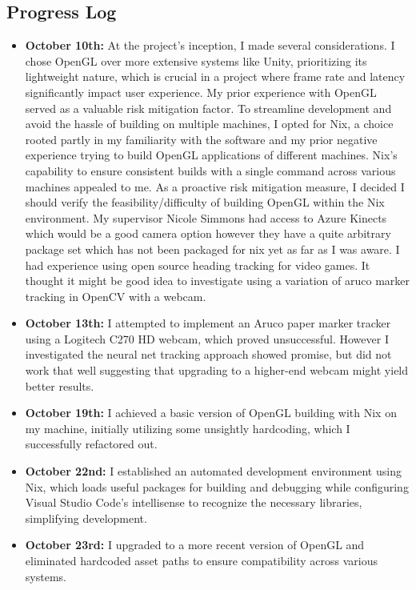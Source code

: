 \subsection{Progress Log}
\begin{itemize}
    \item \textbf{October 10th:} At the project's inception, I made several considerations. I chose OpenGL over more extensive systems like Unity, prioritizing its lightweight nature, which is crucial in a project where frame rate and latency significantly impact user experience. My prior experience with OpenGL served as a valuable risk mitigation factor. To streamline development and avoid the hassle of building on multiple machines, I opted for Nix, a choice rooted partly in my familiarity with the software and my prior negative experience trying to build OpenGL applications of different machines. Nix's capability to ensure consistent builds with a single command across various machines appealed to me. As a proactive risk mitigation measure, I decided I should verify the feasibility/difficulty of building OpenGL within the Nix environment. My supervisor Nicole Simmons had access to Azure Kinects which would be a good camera option however they have a quite arbitrary package set which has not been packaged for nix yet as far as I was aware. I had experience using open source heading tracking for video games. It thought it might be good idea to investigate using a variation of aruco marker
    tracking in OpenCV with a webcam.

    \item \textbf{October 13th:} I attempted to implement an Aruco paper marker tracker using a Logitech C270 HD webcam, which proved unsuccessful. However I investigated the neural net tracking approach showed promise, but did not work that well  suggesting that upgrading to a higher-end webcam might yield better results.

    \item \textbf{October 19th:} I achieved a basic version of OpenGL building with Nix on my machine, initially utilizing some unsightly hardcoding, which I successfully refactored out.

    \item \textbf{October 22nd:} I established an automated development environment using Nix, which loads useful packages for building and debugging while configuring Visual Studio Code's intellisense to recognize the necessary libraries, simplifying development.

    \item \textbf{October 23rd:} I upgraded to a more recent version of OpenGL and eliminated hardcoded asset paths to ensure compatibility across various systems.


\end{itemize}
